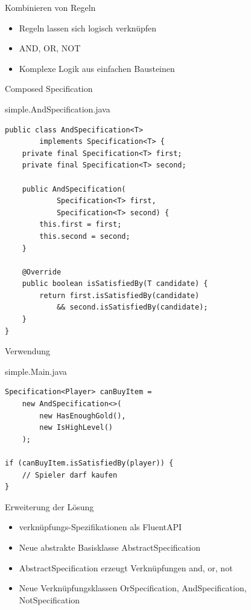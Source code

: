 \begin{frame}{Kombinieren von Regeln}
	\begin{itemize}
	  \item Regeln lassen sich logisch verknüpfen
	  \item AND, OR, NOT
	  \item Komplexe Logik aus einfachen Bausteinen
	\end{itemize}
\end{frame}

\begin{frame}[fragile]{Composed Specification}
	\begin{exampleblock}{simple.AndSpecification.java}
		\begin{lstlisting}
public class AndSpecification<T>
        implements Specification<T> {
    private final Specification<T> first;
    private final Specification<T> second;

    public AndSpecification(
            Specification<T> first,
            Specification<T> second) {
        this.first = first;
        this.second = second;
    }

    @Override
    public boolean isSatisfiedBy(T candidate) {
        return first.isSatisfiedBy(candidate)
            && second.isSatisfiedBy(candidate);
    }
}
		\end{lstlisting}
	\end{exampleblock}
\end{frame}

\begin{frame}[fragile]{Verwendung}
	\begin{exampleblock}{simple.Main.java}
		\begin{lstlisting}
Specification<Player> canBuyItem =
    new AndSpecification<>(
        new HasEnoughGold(),
        new IsHighLevel()
    );

if (canBuyItem.isSatisfiedBy(player)) {
    // Spieler darf kaufen
}
		\end{lstlisting}
	\end{exampleblock}
\end{frame}

\begin{frame}{Erweiterung der Lösung}
	\begin{itemize}
	  \item verknüpfungs-Spezifikationen als FluentAPI
	  \item Neue abstrakte Basisklasse AbstractSpecification
	  \item AbstractSpecification erzeugt Verknüpfungen and, or, not
	  \item Neue Verknüpfungsklassen OrSpecification, AndSpecification, NotSpecification
	\end{itemize}
\end{frame}

